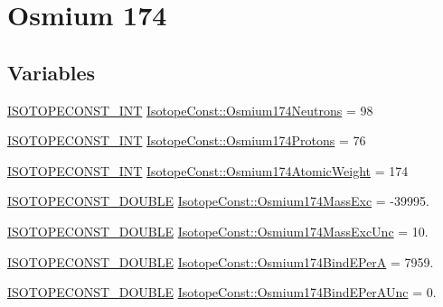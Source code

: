 \hypertarget{group___isotope_const-_osmium-_os174}{}\section{Osmium 174}
\label{group___isotope_const-_osmium-_os174}
\subsection*{Variables}
\begin{DoxyCompactItemize}
\item 
\mbox{\hyperlink{group___isotope_const-_macros_ga5f18360b3e99483a35c32d789e62621c}{I\+S\+O\+T\+O\+P\+E\+C\+O\+N\+S\+T\+\_\+\+I\+NT}} \mbox{\hyperlink{group___isotope_const-_osmium-_os174_ga28f20f8f162e25d81f0402f63d59e99d}{Isotope\+Const\+::\+Osmium174\+Neutrons}} = 98
\item 
\mbox{\hyperlink{group___isotope_const-_macros_ga5f18360b3e99483a35c32d789e62621c}{I\+S\+O\+T\+O\+P\+E\+C\+O\+N\+S\+T\+\_\+\+I\+NT}} \mbox{\hyperlink{group___isotope_const-_osmium-_os174_ga2a9bae00a4a6d5ff6e66cbb8bfca66eb}{Isotope\+Const\+::\+Osmium174\+Protons}} = 76
\item 
\mbox{\hyperlink{group___isotope_const-_macros_ga5f18360b3e99483a35c32d789e62621c}{I\+S\+O\+T\+O\+P\+E\+C\+O\+N\+S\+T\+\_\+\+I\+NT}} \mbox{\hyperlink{group___isotope_const-_osmium-_os174_ga3e7c4146389ab22f114f5f027d841e39}{Isotope\+Const\+::\+Osmium174\+Atomic\+Weight}} = 174
\item 
\mbox{\hyperlink{group___isotope_const-_macros_ga8f45a7272ce02c0b4c65c44636ed719a}{I\+S\+O\+T\+O\+P\+E\+C\+O\+N\+S\+T\+\_\+\+D\+O\+U\+B\+LE}} \mbox{\hyperlink{group___isotope_const-_osmium-_os174_ga6ec379daf3e8a1428f3ad9a7a0e865be}{Isotope\+Const\+::\+Osmium174\+Mass\+Exc}} = -\/39995.
\item 
\mbox{\hyperlink{group___isotope_const-_macros_ga8f45a7272ce02c0b4c65c44636ed719a}{I\+S\+O\+T\+O\+P\+E\+C\+O\+N\+S\+T\+\_\+\+D\+O\+U\+B\+LE}} \mbox{\hyperlink{group___isotope_const-_osmium-_os174_ga15afc7a40645612e1a128c1ac40164f1}{Isotope\+Const\+::\+Osmium174\+Mass\+Exc\+Unc}} = 10.
\item 
\mbox{\hyperlink{group___isotope_const-_macros_ga8f45a7272ce02c0b4c65c44636ed719a}{I\+S\+O\+T\+O\+P\+E\+C\+O\+N\+S\+T\+\_\+\+D\+O\+U\+B\+LE}} \mbox{\hyperlink{group___isotope_const-_osmium-_os174_ga181b7488451f774132b7179ccad6836a}{Isotope\+Const\+::\+Osmium174\+Bind\+E\+PerA}} = 7959.
\item 
\mbox{\hyperlink{group___isotope_const-_macros_ga8f45a7272ce02c0b4c65c44636ed719a}{I\+S\+O\+T\+O\+P\+E\+C\+O\+N\+S\+T\+\_\+\+D\+O\+U\+B\+LE}} \mbox{\hyperlink{group___isotope_const-_osmium-_os174_ga2fec4dd4e2007354b9e89197fc709a5f}{Isotope\+Const\+::\+Osmium174\+Bind\+E\+Per\+A\+Unc}} = 0.

\end{DoxyCompactItemize}
